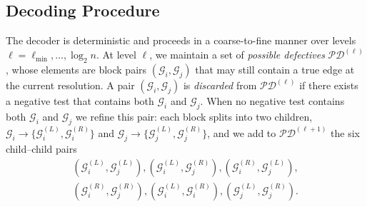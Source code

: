 \documentclass[journal]{IEEEtran}
\theoremstyle{definition}
\theoremstyle{definition}
\newcommand{\Gc}{\mathcal{G}}
\begin{document}


\subsection{Decoding Procedure}
\label{sec:decoding}

The decoder is deterministic and proceeds in a coarse-to-fine manner over levels \(\ell= \ell_{\min}, \dots, \log_2 n \). At level \(\ell\), we maintain a set of \emph{possible defectives} \(\mathcal{PD}^{(\ell)}\), whose elements are block pairs \((\Gc_i,\Gc_j)\) that may still contain a true edge at the current resolution. A pair \((\Gc_i,\Gc_j)\) is \emph{discarded} from \(\mathcal{PD}^{(\ell)}\) if there exists a negative test that contains both \(\Gc_i\) and \(\Gc_j\). When no negative test contains both \(\Gc_i\) and \(\Gc_j\) we refine this pair: each block splits into two children, \(\Gc_i \to \{\Gc_i^{(L)},\Gc_i^{(R)}\}\) and \(\Gc_j \to \{\Gc_j^{(L)},\Gc_j^{(R)}\}\), and we add to \(\mathcal{PD}^{(\ell+1)}\) the six child–child pairs
\begin{equation}
\begin{gathered}
(\Gc_i^{(L)},\Gc_j^{(L)}),
(\Gc_i^{(L)},\Gc_j^{(R)}),
(\Gc_i^{(R)},\Gc_j^{(L)}),\\
(\Gc_i^{(R)},\Gc_j^{(R)}),
(\Gc_i^{(L)},\Gc_i^{(R)}),
(\Gc_j^{(L)},\Gc_j^{(R)}).
\end{gathered}
\label{eq:group_split}
\end{equation}
\end{document}
